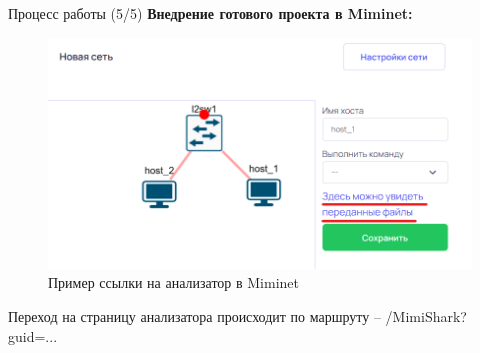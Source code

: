 \documentclass[aspectratio=169]{beamer}
\begin{document}

\begin{frame}[fragile]{Процесс работы (5/5)}
	\textbf{Внедрение готового проекта в Miminet:}
	\begin{figure}[h]

		\centering
			
		\includegraphics[width=0.6\linewidth]{Снимок экрана 2023-05-15 212721.png}
			
		\caption{Пример ссылки на анализатор в Miminet}
			
		\label{fig:mpr}
			
	\end{figure}
	Переход на страницу анализатора происходит по маршруту –
	/MimiShark?guid=...
\end{frame}

\end{document}
